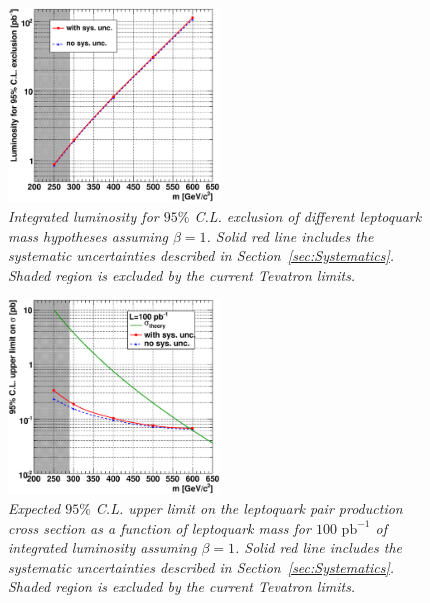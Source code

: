 \begin{figure}[h!]
 \centering
  \includegraphics[width=0.5\textwidth]{plots/cmsPotential/L95CL_vs_m_log.eps}
 \caption{\small \sl Integrated luminosity
for $95\%$ C.L. exclusion of different leptoquark mass hypotheses assuming $\beta=1$. Solid red line includes the systematic
uncertainties described in Section~\ref{sec:Systematics}. Shaded region is excluded by the current Tevatron limits.\label{fig:exclusion}}
\end{figure}
\begin{figure}[h!]
 \centering
  \includegraphics[width=0.5\textwidth]{plots/cmsPotential/xs95CL_vs_m_log.eps}
 \caption{\small \sl Expected $95\%$ C.L. upper limit on the leptoquark pair production cross section as a function of leptoquark mass for $100\text{ pb}^{-1}$
of integrated luminosity assuming $\beta=1$. Solid red line includes the systematic uncertainties described in Section~\ref{sec:Systematics}.
Shaded region is excluded by the current Tevatron limits.
\label{fig:exclusion_xs}}
\end{figure}



